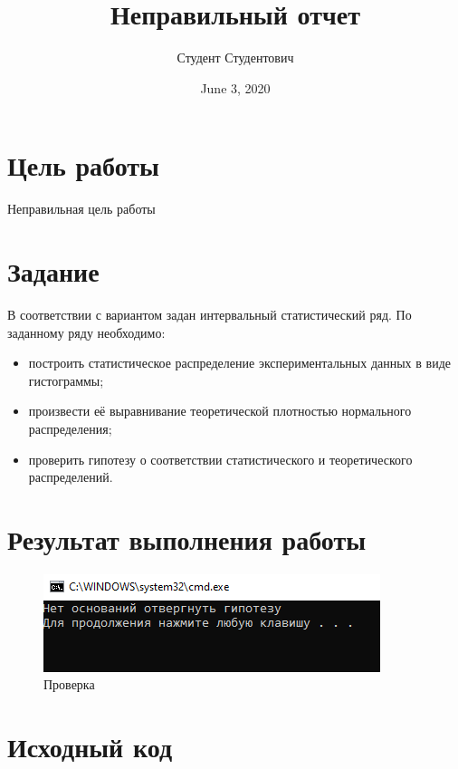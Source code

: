 \documentclass[a4paper,14pt]{article}
\begin{document}
\title{\Large{\textbf{Неправильный отчет}}}
\author{Студент Студентович}
\date{June 3, 2020}

\maketitle


\section{Цель работы}

Неправильная цель работы

\section{Задание}

В соответствии с вариантом задан интервальный статистический ряд. По заданному ряду необходимо:
\begin{itemize}
	\item построить статистическое распределение экспериментальных данных в виде гистограммы;
	\item произвести её выравнивание теоретической плотностью нормального распределения;
	\item проверить гипотезу о соответствии статистического и теоретического распределений.
\end{itemize}

\section{Результат выполнения работы}

\begin{figure}[H] %
	\centering
	\includegraphics{img2.png} %
	\caption{Проверка}
\end{figure}

\section{Исходный код}
\end{document}
